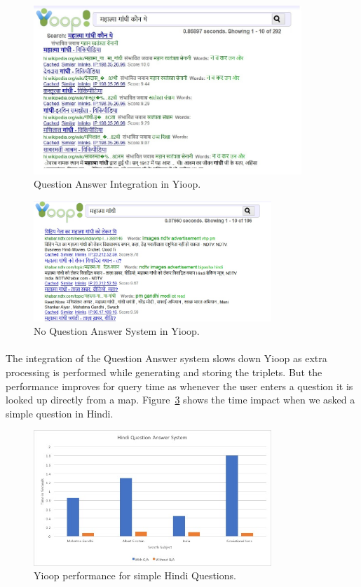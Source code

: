 \begin{figure}[htb]
\centering
\includegraphics[width=0.9\textwidth]{images/QA_IntegratedInYioop.jpg}
\caption{Question Answer Integration in Yioop.} 
\label{fig:QA_IntegratedInYioop}
\end{figure}
\break

\begin{figure}[htb]
\centering
\includegraphics[width=0.8\textwidth]{images/Yioop_NoQA.jpg}
\caption{No Question Answer System in Yioop.} 
\label{fig:Yioop_NoQA}
\end{figure}

\paragraph{}
The integration of the Question Answer system slows down Yioop as extra processing is performed while generating and storing the triplets. But the performance improves for query time as whenever the  user enters a question it is looked up directly from a map. Figure~\ref{fig:QA_performance1} shows the time impact when we asked a simple question in Hindi.

\begin{figure}[htb]
\centering
\includegraphics[width=0.8\textwidth]{images/QA_performance1.jpg}
\caption{Yioop performance for simple Hindi Questions.} 
\label{fig:QA_performance1}
\end{figure}

